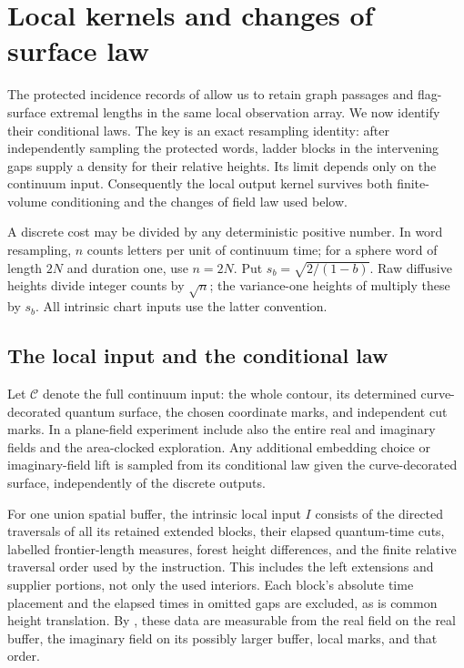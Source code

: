 \documentclass[11pt]{article}
\numberwithin{equation}{section}
\theoremstyle{definition}
\theoremstyle{remark}
\newcommand{\1}{\mathbf 1}
\begin{document}
\section{Local kernels and changes of surface law}\label{ker:section}

The protected incidence records of 
allow us to retain graph passages and flag-surface extremal lengths
in the same local observation array. We now identify their conditional
laws. The key is an exact resampling identity: after independently
sampling the protected words, ladder blocks in the intervening gaps
supply a density for their relative heights. Its limit depends only
on the continuum input. Consequently the local output kernel survives
both finite-volume conditioning and the changes of field law used below.

A discrete cost may be divided by any deterministic positive number.
In word resampling, \(n\) counts letters per unit of continuum time;
for a sphere word of length \(2N\) and duration one, use \(n=2N\).
Put \(s_b=\sqrt{2/(1-b)}\). Raw diffusive heights divide integer counts
by \(\sqrt n\); the variance-one heights of 
multiply these by \(s_b\). All intrinsic chart inputs use the latter
convention.

\subsection{The local input and the conditional law}

Let \(\mathcal C\) denote the full continuum input: the whole contour,
its determined curve-decorated quantum surface, the chosen coordinate
marks, and independent cut marks. In a plane-field experiment include
also the entire real and imaginary fields and the area-clocked
exploration. Any additional embedding choice or imaginary-field lift
is sampled from its conditional law given the curve-decorated surface,
independently of the discrete outputs.

For one union spatial buffer, the intrinsic local input \(I\) consists
of the directed traversals of all its retained extended blocks, their
elapsed quantum-time cuts, labelled frontier-length measures, forest height
differences, and the finite relative traversal order used by the
instruction. This includes the left extensions and supplier portions,
not only the used interiors. Each block's absolute time placement and
the elapsed times in omitted gaps are excluded, as is common height
translation.
By , these data are
measurable from the real field on the real buffer, the imaginary field
on its possibly larger buffer, local marks, and that order.
\end{document}
